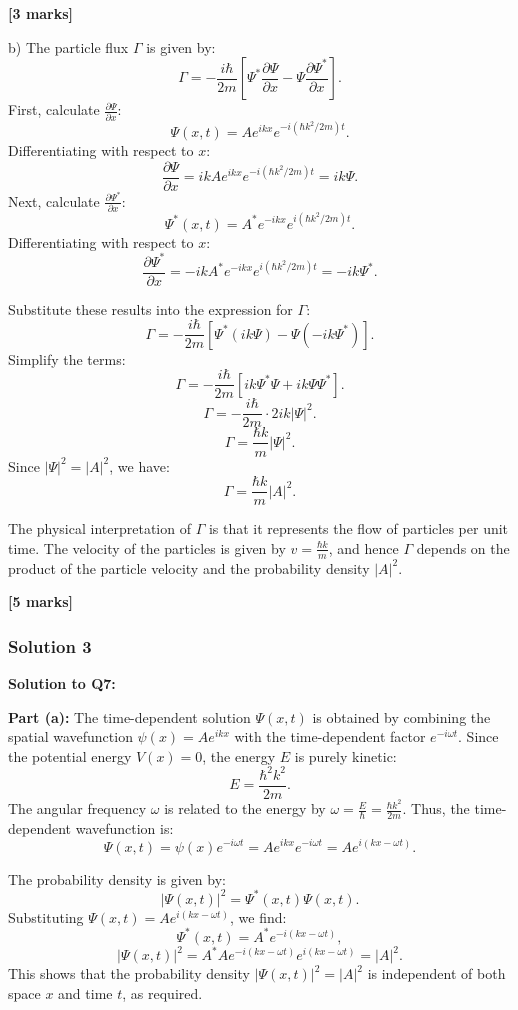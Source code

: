 \documentclass{article}
\begin{document}
\textbf{[3 marks]}

b) The particle flux $\Gamma$ is given by:
\[
\Gamma = -\frac{i \hbar}{2m} \left[ \Psi^* \frac{\partial \Psi}{\partial x} - \Psi \frac{\partial \Psi^*}{\partial x} \right].
\]
First, calculate $\frac{\partial \Psi}{\partial x}$:
\[
\Psi(x,t) = A e^{ikx} e^{-i(\hbar k^2 / 2m)t}.
\]
Differentiating with respect to $x$:
\[
\frac{\partial \Psi}{\partial x} = ik A e^{ikx} e^{-i(\hbar k^2 / 2m)t} = ik \Psi.
\]
Next, calculate $\frac{\partial \Psi^*}{\partial x}$:
\[
\Psi^*(x,t) = A^* e^{-ikx} e^{i(\hbar k^2 / 2m)t}.
\]
Differentiating with respect to $x$:
\[
\frac{\partial \Psi^*}{\partial x} = -ik A^* e^{-ikx} e^{i(\hbar k^2 / 2m)t} = -ik \Psi^*.
\]

Substitute these results into the expression for $\Gamma$:
\[
\Gamma = -\frac{i \hbar}{2m} \left[ \Psi^* (ik\Psi) - \Psi (-ik\Psi^*) \right].
\]
Simplify the terms:
\[
\Gamma = -\frac{i \hbar}{2m} \left[ i k \Psi^* \Psi + i k \Psi \Psi^* \right].
\]
\[
\Gamma = -\frac{i \hbar}{2m} \cdot 2i k |\Psi|^2.
\]
\[
\Gamma = \frac{\hbar k}{m} |\Psi|^2.
\]
Since $|\Psi|^2 = |A|^2$, we have:
\[
\Gamma = \frac{\hbar k}{m} |A|^2.
\]

The physical interpretation of $\Gamma$ is that it represents the flow of particles per unit time. The velocity of the particles is given by $v = \frac{\hbar k}{m}$, and hence $\Gamma$ depends on the product of the particle velocity and the probability density $|A|^2$.

\textbf{[5 marks]}

\subsubsection{Solution 3}
\textbf{Solution to Q7:}

\textbf{Part (a):}  
The time-dependent solution $\Psi(x,t)$ is obtained by combining the spatial wavefunction $\psi(x) = A e^{ikx}$ with the time-dependent factor $e^{-i\omega t}$. Since the potential energy $V(x) = 0$, the energy $E$ is purely kinetic:  
\[
E = \frac{\hbar^2 k^2}{2m}.
\]  
The angular frequency $\omega$ is related to the energy by $\omega = \frac{E}{\hbar} = \frac{\hbar k^2}{2m}$. Thus, the time-dependent wavefunction is:  
\[
\Psi(x,t) = \psi(x)e^{-i\omega t} = A e^{ikx} e^{-i\omega t} = A e^{i(kx - \omega t)}.
\]

The probability density is given by:  
\[
|\Psi(x,t)|^2 = \Psi^*(x,t)\Psi(x,t).
\]  
Substituting $\Psi(x,t) = A e^{i(kx - \omega t)}$, we find:  
\[
\Psi^*(x,t) = A^* e^{-i(kx - \omega t)},
\]
\[
|\Psi(x,t)|^2 = A^*A e^{-i(kx - \omega t)}e^{i(kx - \omega t)} = |A|^2.
\]
This shows that the probability density $|\Psi(x,t)|^2 = |A|^2$ is independent of both space $x$ and time $t$, as required.
\end{document}
